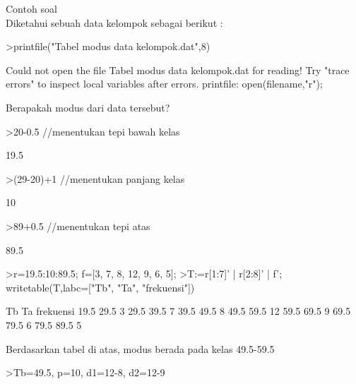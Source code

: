\documentclass[a4paper,10pt]{article}
\begin{document}
\begin{eulernotebook}
\begin{eulercomment}
\begin{eulercomment}
\begin{eulercomment}
\begin{eulercomment}
\begin{eulercomment}
\begin{eulercomment}
\begin{eulercomment}
\begin{eulercomment}
\begin{eulercomment}
\begin{eulercomment}
\begin{eulercomment}
Contoh soal\\
Diketahui sebuah data kelompok sebagai berikut :
\end{eulercomment}
\begin{eulerprompt}
>printfile("Tabel modus data kelompok.dat",8) 
\end{eulerprompt}
\begin{euleroutput}
  Could not open the file
  Tabel modus data kelompok.dat
  for reading!
  Try "trace errors" to inspect local variables after errors.
  printfile:
      open(filename,"r");
\end{euleroutput}
\begin{eulercomment}
Berapakah modus dari data tersebut?
\end{eulercomment}
\begin{eulerprompt}
>20-0.5  //menentukan tepi bawah kelas
\end{eulerprompt}
\begin{euleroutput}
  19.5
\end{euleroutput}
\begin{eulerprompt}
>(29-20)+1 //menentukan panjang kelas
\end{eulerprompt}
\begin{euleroutput}
  10
\end{euleroutput}
\begin{eulerprompt}
>89+0.5 //menentukan tepi atas
\end{eulerprompt}
\begin{euleroutput}
  89.5
\end{euleroutput}
\begin{eulerprompt}
>r=19.5:10:89.5; f=[3, 7, 8, 12, 9, 6, 5];
>T:=r[1:7]' | r[2:8]' | f'; writetable(T,labc=["Tb", "Ta", "frekuensi"])
\end{eulerprompt}
\begin{euleroutput}
          Tb        Ta frekuensi
        19.5      29.5         3
        29.5      39.5         7
        39.5      49.5         8
        49.5      59.5        12
        59.5      69.5         9
        69.5      79.5         6
        79.5      89.5         5
\end{euleroutput}
\begin{eulercomment}
Berdasarkan tabel di atas, modus berada pada kelas 49.5-59.5
\end{eulercomment}
\begin{eulerprompt}
>Tb=49.5, p=10, d1=12-8, d2=12-9
\end{eulerprompt}
\begin{euleroutput}

\end{euleroutput}
\end{eulercomment}
\end{eulercomment}
\end{eulercomment}
\end{eulercomment}
\end{eulercomment}
\end{eulercomment}
\end{eulercomment}
\end{eulercomment}
\end{eulercomment}
\end{eulercomment}
\end{eulernotebook}
\end{document}
